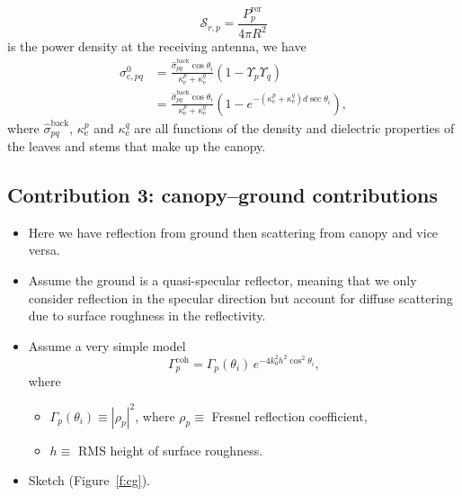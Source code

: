 \documentclass[11pt, oneside]{article}
\newcommand{\ke}[1]{\kappa_\mathrm{e}^{#1}}
\newcommand{\sback}{\hat{\sigma}^\mathrm{back}_{pq}}
\newcommand{\Gc}[1]{\Gamma_{#1}^\mathrm{coh}}
\begin{document}
\begin{itemize}
\begin{equation*}
		\mathcal{S}_{r,p} = \frac{P_p^\mathrm{rer}}{4\pi R^2}
	\end{equation*}
	is the power density at the receiving antenna, we have
	\begin{align}
		\sigma^0_{\mathrm{c},pq} &= \frac{\sback\cos\theta_i}{\ke{p}+\ke{q}}\left(1 - \Upsilon_p\Upsilon_q\right) \nonumber\\
		&= \frac{\sback\cos\theta_i}{\ke{p}+\ke{q}}\left(1 - e^{-(\ke{p}+\ke{q})d\sec\theta_i}\right), \label{e:sc}
	\end{align}
	where $\sback$, $\ke{p}$ and $\ke{q}$ are all functions of the density and dielectric properties of the leaves and stems that make up the canopy.
\end{itemize}

\subsection{Contribution 3: canopy--ground contributions}
\label{s:cg}

\begin{itemize}
	\item Here we have reflection from ground then scattering from canopy and vice versa.
	\item Assume the ground is a quasi-specular reflector, meaning that we only consider reflection in the specular direction but account for diffuse scattering due to surface roughness in the reflectivity.
	\item Assume a very simple model
	\begin{equation}
		\label{e:Gcoh}
		\Gc{p} = \Gamma_p(\theta_i)\,e^{-4k_0^2h^2\cos^2\theta_i},
	\end{equation}
	where
	\begin{itemize}
		\item[] $\Gamma_p(\theta_i) \equiv |\rho_p|^2$, where $\rho_p \equiv$ Fresnel reflection coefficient,
		\item[] $h \equiv$ RMS height of surface roughness.
	\end{itemize}
	\item Sketch (Figure~\ref{f:cg}).
\end{itemize}
\end{document}
